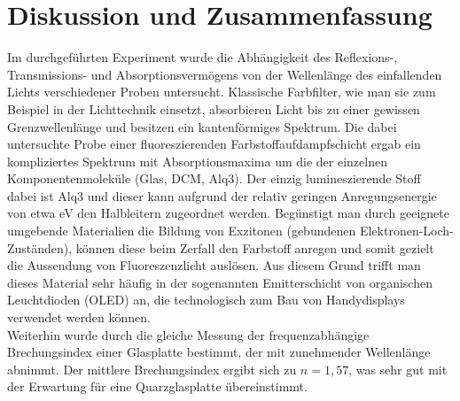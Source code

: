 \section{Diskussion und Zusammenfassung}
	Im durchgeführten Experiment wurde die Abhängigkeit des Reflexions-, Trans\-mis\-sions- und Absorptionsvermögens von der Wellenlänge des einfallenden Lichts verschiedener Proben untersucht. Klassische Farbfilter, wie man sie zum Beispiel in der Lichttechnik einsetzt, absorbieren Licht bis zu einer gewissen Grenzwellenlänge und besitzen ein kantenförmiges Spektrum. 
	Die dabei untersuchte Probe einer fluoreszierenden Farbstoffaufdampfschicht ergab ein kompliziertes Spektrum mit Absorptionsmaxima um die der einzelnen Komponentenmoleküle (Glas, DCM, Alq3). Der einzig lumineszierende Stoff dabei ist Alq3 und dieser kann aufgrund der relativ geringen Anregungsenergie von etwa \unit[3,1]{eV} den Halbleitern zugeordnet werden. Begünstigt man durch geeignete umgebende Materialien die Bildung von Exzitonen (gebundenen Elektronen-Loch-Zuständen), können diese beim Zerfall den Farbstoff anregen und somit gezielt die Aussendung von Fluoreszenzlicht auslösen. Aus diesem Grund trifft man dieses Material sehr häufig in der sogenannten Emitterschicht von organischen Leuchtdioden (OLED) an, die technologisch zum Bau von Handydisplays verwendet werden können.\\
	Weiterhin wurde durch die gleiche Messung der frequenzabhängige Brechungsindex einer Glasplatte bestimmt, der mit zunehmender Wellenlänge abnimmt. Der mittlere Brechungsindex ergibt sich zu $n = 1,57$, was sehr gut mit der Erwartung für eine Quarzglasplatte übereinstimmt.